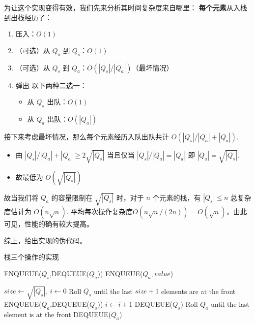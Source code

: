 \documentclass{tufte-handout}
\begin{document}
\begin{CJK*}{UTF8}{gbsn}
\begin{itemize}
\end{itemize}
为让这个实现变得有效，我们先来分析其时间复杂度来自哪里：
\textbf{每个元素}从入栈到出栈经历了：
\begin{enumerate}
\item 压入：$O(1)$
\item （可选）从 $Q_a$ 到 $Q_s$：$O(1)$
\item （可选）从 $Q_s$ 到 $Q_a$：$O(|Q_s|/|Q_a|)$（最坏情况）
\item 弹出 以下两种二选一：
    \begin{itemize}
        \item 从 $Q_s$ 出队：$O(1)$
        \item 从 $Q_a$ 出队：$O(|Q_a|)$
    \end{itemize}
\end{enumerate}
接下来考虑最坏情况，那么每个元素经历入队出队共计 $O(|Q_s|/|Q_a|+|Q_a|)$.
\begin{itemize}
    \item 由 $|Q_s|/|Q_a|+|Q_a| \ge 2\sqrt{|Q_s|}$ 当且仅当 $|Q_s|/|Q_a|=|Q_a|$ 即 $|Q_a|=\sqrt{|Q_s|}$.
    \item 故最低为 $O(\sqrt{|Q_s|})$
\end{itemize}
故当我们将 $Q_a$ 的容量限制在 $\sqrt{|Q_s|}$ 时，对于 $n$ 个元素的栈，有 $|Q_s|\le n$ 总复杂度估计为 $O(n\sqrt n)$.
平均每次操作复杂度$O(n\sqrt n/(2n))=O(\sqrt n)$，由此可见，性能的确有较大提高。


综上，给出实现的伪代码。

\begin{algorithm}[t]
\caption{栈三个操作的实现}
\begin{algorithmic}[1]

    \State ENQUEUE($Q_s$,DEQUEUE($Q_a$))
    \EndIf
    \State ENQUEUE($Q_a,value$)
    \hStatex
    \EndProcedure

    \State $size \gets \sqrt{|Q_s|}$, $i \gets 0$
    \State Roll $Q_s$ until the last $size+1$ elements are at the front
    \State ENQUEUE($Q_a$,DEQUEUE($Q_s$))
    \State $i \gets i+1$
    \EndWhile
    \Return DEQUEUE($Q_s$)
    \Else
    \State Roll $Q_a$ until the last element is at the front
    \Return DEQUEUE($Q_a$)
    \EndIf
    \hStatex
    \EndProcedure


\end{algorithmic}
\end{algorithm}
\end{CJK*}
\end{document}
